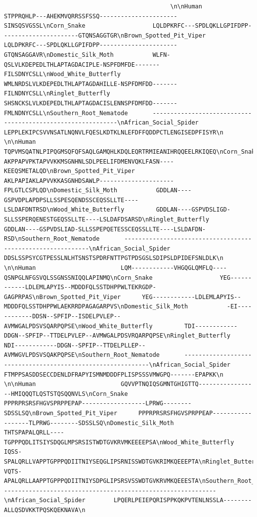 \documentclass[
  letterpaper,
  DIV=11,
  numbers=noendperiod]{scrartcl}
\begin{document}
\begin{verbatim}
                                               \n\nHuman                        STPPRQHLP---AHEKMVQRRSSFSSQ----------------------SINSQSVGSSL\nCorn_Snake                   LQLDPKRFC---SPDLQKLLGPIFDPP----------------------GTQNSAGGTGR\nBrown_Spotted_Pit_Viper      LQLDPKRFC---SPDLQKLLGPIFDPP----------------------GTQNSAGGAVR\nDomestic_Silk_Moth           WLFN-QSLVLKDEPEDLTHLAPTAGDACIPLE-NSPFDMFDE-------FILSDNYCSLL\nWood_White_Butterfly         WMLNRDSLVLKDEPEDLTHLAPTAGDAHILLE-NSPFDMFDD-------FILNDNYCSLL\nRinglet_Butterfly            SHSNCKSLVLKDEPEDLTHLAPTAGDACISLENNSPFDMFDD-------FMLNDNYCSLL\nSouthern_Root_Nematode       ------------------------------------------------------------\nAfrican_Social_Spider        LEPPLEKIPCSVVNSATLNQNVLFQESLKDTKLNLEFDFFQDDPCTLENGISEDPFISYR\n                                                                                         \n\nHuman                        TQPVMSQATNLPIPQGMSQFQFSAQLGAMQHLKDQLEQRTRMIEANIHRQQEELRKIQEQ\nCorn_Snake                   AKPPAPVPKTAPVVKKMSGNHNLSDLPEELIFDMENVQKLFASN----KEEQSMETALQD\nBrown_Spotted_Pit_Viper      AKLPAPIAKLAPVVKKASGNHDSAWLP---------------------FPLGTLCSPLQD\nDomestic_Silk_Moth           GDDLAN----GSPVDPLAPDPSLLSSPESQENDSSCEQSSLLTE----LSLDAFDNTRSD\nWood_White_Butterfly         GDDLAN----GSPVDSLIGD-SLLSSPERQENESTGEQSSLLTE----LSLDAFDSARSD\nRinglet_Butterfly            GDDLAN----GSPVDSLIAD-SLLSSPEPQETESSCEQSSLLTE----LSLDAFDN-RSD\nSouthern_Root_Nematode       ------------------------------------------------------------\nAfrican_Social_Spider        DDSLSSPSYCGTPESSLNLHTSNSTSPDRFNTTPGTPDSGSLSDIPSLDPIDEFSNLDLK\n                                                                                         \n\nHuman                        LQM------------VHGQGLQMFLQ----QSNPGLNFGSVQLSSGNSSNIQQLAPINMQ\nCorn_Snake                   YEG------------LDLEMLAPYIS--MDDDFQLSSTDHPPWLTEKRGDP-GAGPRPAS\nBrown_Spotted_Pit_Viper      YEG------------LDLEMLAPYIS--MDDDFQLSSTDHPPWLAEKRRDPAGAGARPVS\nDomestic_Silk_Moth           -EI------------DDSN--SPFIP--ISDELPVLEP--AVMWGALPDSVSQARPQPSE\nWood_White_Butterfly         TDI------------DDGN--SPFIP--TTDELPVLEP--AVMWGALPDSVRQARPQPSE\nRinglet_Butterfly            NDI------------DDGN--SPFIP--TTDELPLLEP--AVMWGVLPDSVSQAKPQPSE\nSouthern_Root_Nematode       ------------------------------------------------------------\nAfrican_Social_Spider        FTMPPSASDDSECCDENLDFRAPYISMNMDDDFPLISPSSSVMWGPQ-------EPAPKK\n                                                                                         \n\nHuman                        GQVVPTNQIQSGMNTGHIGTTQ-----------------HMIQQQTLQSTSTQSQQNVLS\nCorn_Snake                   PPPRPRSRSFHGVSPRPPEPAP------------------LPRWG--------SDSSLSQ\nBrown_Spotted_Pit_Viper      PPPRPRSRSFHGVSPRPPEAP------------------TLPRWG--------SDSSLSQ\nDomestic_Silk_Moth           THTSPAPALQRLL----TGPPPQDLITSIYSDQGLMPSRSISTWDTGVKRVMKEEEEPSA\nWood_White_Butterfly         IQSS-SPALQRLLVAPPTGPPPQDIITNIYSEQGLIPSRNISSWDTGVKRIMKQEEEPTA\nRinglet_Butterfly            VQTS-APALQRLLAAPPTGPPPQDIITNIYSDPGLIPSRSVSSWDTGVKRVMKQEEESTA\nSouthern_Root_Nematode       ------------------------------------------------------------\nAfrican_Social_Spider        LPQERLPEIEPQRISPPKQKPVTENLNSSLA--------ALLQSDVKKTPQSKQEKNAVA\n                                                                             
\end{verbatim}
\end{document}
